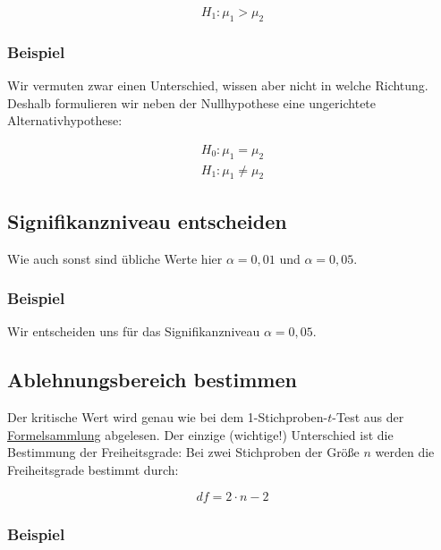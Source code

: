 \documentclass[
  11pt,
  ngerman,
  a4paper,
]{report}
\begin{document}
\[
H_1 : \mu_1 > \mu_2
\label{eq:h21g}
\]

\hypertarget{beispiel-12}{%
\subsubsection{Beispiel}\label{beispiel-12}}

Wir vermuten zwar einen Unterschied, wissen aber nicht in welche Richtung. Deshalb formulieren wir neben der Nullhypothese eine ungerichtete Alternativhypothese:

\[\begin{aligned}
H_0 : \mu_1 = \mu_2\\[4pt]
H_1 : \mu_1 \neq \mu_2
\end{aligned}\]

\hypertarget{signifikanzniveau-entscheiden-2}{%
\subsection{Signifikanzniveau entscheiden}\label{signifikanzniveau-entscheiden-2}}

Wie auch sonst sind übliche Werte hier \(\alpha=0{,}01\) und \(\alpha=0{,}05\).

\hypertarget{beispiel-13}{%
\subsubsection{Beispiel}\label{beispiel-13}}

Wir entscheiden uns für das Signifikanzniveau \(\alpha=0{,}05\).

\hypertarget{ablehnungsbereich-bestimmen-2}{%
\subsection{Ablehnungsbereich bestimmen}\label{ablehnungsbereich-bestimmen-2}}

Der kritische Wert wird genau wie bei dem 1-Stichproben-\(t\)-Test aus der \href{Formelsammlung\%20und\%20Wertetabellen.pdf}{Formelsammlung} abgelesen. Der einzige (wichtige!) Unterschied ist die Bestimmung der Freiheitsgrade: Bei zwei Stichproben der Größe \(n\) werden die Freiheitsgrade bestimmt durch:

\[
\mathit{df}=2\cdot n -2
\label{eq:df2sp}
\]

\hypertarget{beispiel-14}{%
\subsubsection{Beispiel}\label{beispiel-14}}
\end{document}
